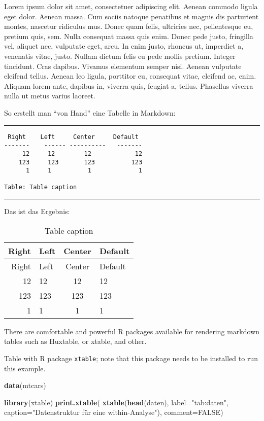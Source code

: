 \documentclass[11pt,ngerman,a4paper,oneside]{article}
\newenvironment{Shaded}{\begin{snugshade}}{\end{snugshade}}
\newcommand{\KeywordTok}[1]{\textcolor[rgb]{0.13,0.29,0.53}{\textbf{#1}}}
\newcommand{\DataTypeTok}[1]{\textcolor[rgb]{0.13,0.29,0.53}{#1}}
\newcommand{\StringTok}[1]{\textcolor[rgb]{0.31,0.60,0.02}{#1}}
\newcommand{\OtherTok}[1]{\textcolor[rgb]{0.56,0.35,0.01}{#1}}
\newcommand{\NormalTok}[1]{#1}
\begin{document}
Lorem ipsum dolor sit amet, consectetuer adipiscing elit. Aenean commodo
ligula eget dolor. Aenean massa. Cum sociis natoque penatibus et magnis
dis parturient montes, nascetur ridiculus mus. Donec quam felis,
ultricies nec, pellentesque eu, pretium quis, sem. Nulla consequat massa
quis enim. Donec pede justo, fringilla vel, aliquet nec, vulputate eget,
arcu. In enim justo, rhoncus ut, imperdiet a, venenatis vitae, justo.
Nullam dictum felis eu pede mollis pretium. Integer tincidunt. Cras
dapibus. Vivamus elementum semper nisi. Aenean vulputate eleifend
tellus. Aenean leo ligula, porttitor eu, consequat vitae, eleifend ac,
enim. Aliquam lorem ante, dapibus in, viverra quis, feugiat a, tellus.
Phasellus viverra nulla ut metus varius laoreet.

So erstellt man \enquote{von Hand} eine Tabelle in Markdown:

\begin{center}\rule{0.5\linewidth}{\linethickness}\end{center}

\begin{verbatim}
 Right    Left     Center     Default
-------    ------ ----------   -------
     12     12        12            12
    123     123       123          123
      1     1          1             1
      
Table: Table caption
\end{verbatim}

\begin{center}\rule{0.5\linewidth}{\linethickness}\end{center}

Das ist das Ergebnis:

\begin{longtable}[]{@{}rlcl@{}}
\caption{Table caption}\tabularnewline
\toprule
Right & Left & Center & Default\tabularnewline
\midrule
\endfirsthead
\toprule
Right & Left & Center & Default\tabularnewline
\midrule
\endhead
12 & 12 & 12 & 12\tabularnewline
123 & 123 & 123 & 123\tabularnewline
1 & 1 & 1 & 1\tabularnewline
\bottomrule
\end{longtable}

There are comfortable and powerful R packages available for rendering
markdown tables such as Huxtable, or xtable, and other.

Table with R package \texttt{xtable}; note that this package needs to be
installed to run this example.

\begin{Shaded}
\begin{Highlighting}[]
\KeywordTok{data}\NormalTok{(mtcars)}

\KeywordTok{library}\NormalTok{(xtable)}
\KeywordTok{print.xtable}\NormalTok{(}
  \KeywordTok{xtable}\NormalTok{(}\KeywordTok{head}\NormalTok{(daten), }
         \DataTypeTok{label=}\StringTok{"tab:daten"}\NormalTok{, }
         \DataTypeTok{caption=}\StringTok{"Datenstruktur für eine within-Analyse"}\NormalTok{), }
  \DataTypeTok{comment=}\OtherTok{FALSE}\NormalTok{)}
\end{Highlighting}
\end{Shaded}
\end{document}
